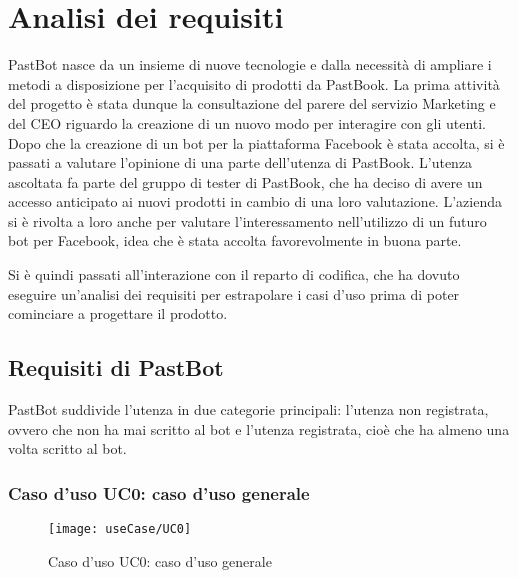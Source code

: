
\chapter{Analisi dei requisiti}

PastBot nasce da un insieme di nuove tecnologie e dalla necessità di ampliare i
metodi a disposizione per l'acquisito di prodotti da PastBook.
La prima attività del progetto è stata dunque la consultazione del parere del
servizio Marketing e del CEO riguardo la creazione di un nuovo modo per
interagire con gli utenti. Dopo che la creazione di un bot per la piattaforma
Facebook è stata accolta, si è passati a valutare l'opinione di una parte
dell'utenza di PastBook. L'utenza ascoltata fa parte del gruppo di tester di
PastBook, che ha deciso di avere un accesso anticipato ai nuovi prodotti in
cambio di una loro valutazione. L'azienda si è rivolta a loro anche per valutare
l'interessamento nell'utilizzo di un futuro bot per Facebook, idea che è stata
accolta favorevolmente in buona parte.

Si è quindi passati all'interazione con il reparto di codifica, che ha dovuto
eseguire un'analisi dei requisiti per estrapolare i casi d'uso prima di poter
cominciare a progettare il prodotto.

\section{Requisiti di PastBot}

PastBot suddivide l'utenza in due categorie principali:
l'utenza non registrata, ovvero che non ha mai scritto al bot e
l'utenza registrata, cioè che ha almeno una volta scritto al bot.

\subsection{Caso d'uso UC0: caso d'uso generale}
\label{uc:uc0}

\begin{figure}[H]
  \centering
  \texttt{[image: useCase/UC0]}
  \caption{Caso d'uso UC0: caso d'uso generale}
\end{figure}

